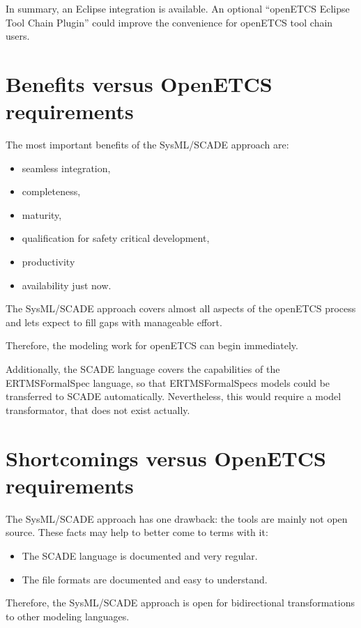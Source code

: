 In summary, an Eclipse integration is available. An optional "`openETCS Eclipse Tool Chain Plugin"' could improve the convenience for openETCS tool chain users. 


\section{Benefits versus OpenETCS requirements}

The most important benefits of the SysML/SCADE approach are: 

\begin{itemize}
	\item seamless integration,
	\item completeness,
	\item maturity,
	\item qualification for safety critical development,
	\item productivity
	\item availability just now.
\end{itemize}
 
The SysML/SCADE approach covers almost all aspects of the openETCS process and lets expect to fill gaps with manageable effort.

Therefore, the modeling work for openETCS can begin immediately. 

Additionally, the SCADE language covers the capabilities of the ERTMSFormalSpec language, so that ERTMSFormalSpecs models could be transferred to SCADE automatically. Nevertheless, this would require a model transformator, that does not exist actually.   


\section{Shortcomings versus OpenETCS requirements}

The SysML/SCADE approach has one drawback: the tools are mainly not open source. 
These facts may help to better come to terms with it:

\begin{itemize}
	\item The SCADE language is documented and very regular. 
	\item The file formats are documented and easy to understand. 
\end{itemize}

Therefore, the SysML/SCADE approach is open for bidirectional transformations to other modeling languages. 


